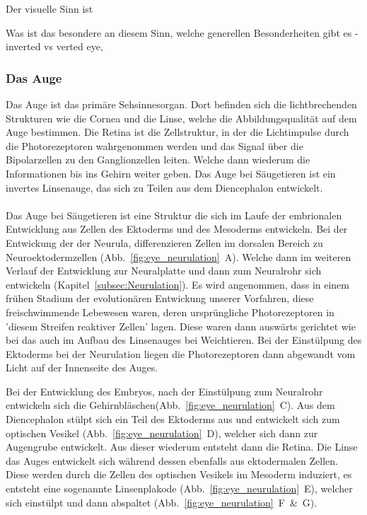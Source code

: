 \documentclass[12pt,a4paper,pdftex]{article}
\begin{document}
Der visuelle Sinn ist 

Was ist das besondere an diesem Sinn, welche generellen Besonderheiten gibt es - inverted vs verted eye, 


\subsubsection*{Das Auge}
Das Auge ist das primäre Sehsinnesorgan. Dort befinden sich die lichtbrechenden Strukturen wie die Cornea  und die Linse,  welche die Abbildungsqualität auf dem Auge bestimmen. Die Retina ist die Zellstruktur, in der die Lichtimpulse durch die Photorezeptoren wahrgenommen werden und das Signal über die Bipolarzellen zu den Ganglionzellen leiten. Welche dann wiederum die Informationen bis ins Gehirn weiter geben.
Das Auge bei Säugetieren ist ein invertes Linsenauge,  das sich zu Teilen aus dem Diencephalon entwickelt. 
\\
\\
Das Auge bei Säugetieren ist eine Struktur die sich im Laufe der embrionalen Entwicklung aus Zellen des Ektoderms und des Mesoderms entwickeln. Bei der Entwickung der der Neurula, differenzieren Zellen im dorsalen Bereich zu Neuroektodermzellen  (Abb.~\ref{fig:eye_neurulation}~A). Welche dann im weiteren Verlauf der Entwicklung zur Neuralplatte und dann zum Neuralrohr sich entwickeln (Kapitel~\ref{subsec:Neurulation}). 
Es wird angenommen, dass in einem frühen Stadium der evolutionären Entwickung unserer Vorfahren, diese freischwimmende Lebewesen waren, deren ursprüngliche Photorezeptoren in 'diesem Streifen reaktiver Zellen' lagen. Diese waren dann auswärts gerichtet wie bei das auch im Aufbau des Linsenauges bei Weichtieren. Bei der Einstülpung des Ektoderms bei der Neurulation liegen die Photorezeptoren dann abgewandt vom Licht auf der Innenseite des Auges. 

Bei der Entwicklung des Embryos, nach der Einstülpung zum Neuralrohr entwickeln sich die Gehirnbläschen(Abb.~\ref{fig:eye_neurulation}~C). Aus dem Diencephalon stülpt sich ein Teil des Ektoderms aus und entwickelt sich zum optischen Vesikel (Abb.~\ref{fig:eye_neurulation}~D), welcher sich dann zur Augengrube  entwickelt. Aus dieser wiederum entsteht dann die Retina. Die Linse das Auges entwickelt sich während dessen ebenfalls aus ektodermalen Zellen. Diese werden durch die Zellen des optischen Vesikels  im Mesoderm induziert, es entsteht eine sogenannte Linsenplakode  (Abb.~\ref{fig:eye_neurulation}~E), welcher sich einstülpt und dann abspaltet (Abb.~\ref{fig:eye_neurulation}~F~\&~G).
\end{document}
